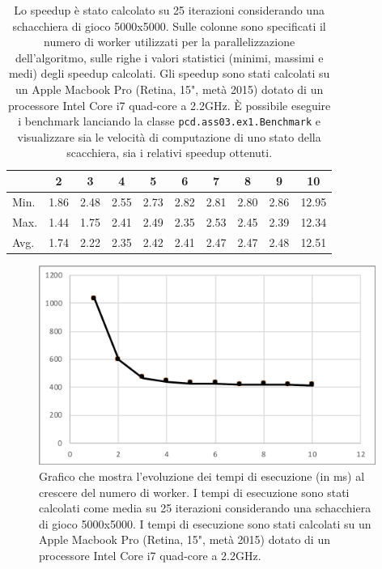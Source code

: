 \documentclass[a4paper]{article}
\begin{document}
\begin{table}[H]
\centering
\begin{tabular}{l|ccccccccc}
\hline
     & 2    & 3    & 4    & 5    & 6    & 7    & 8    & 9    & 10    \\ \hline
Min. & 1.86 & 2.48 & 2.55 & 2.73 & 2.82 & 2.81 & 2.80 & 2.86 & 12.95 \\
Max. & 1.44 & 1.75 & 2.41 & 2.49 & 2.35 & 2.53 & 2.45 & 2.39 & 12.34 \\
Avg. & 1.74 & 2.22 & 2.35 & 2.42 & 2.41 & 2.47 & 2.47 & 2.48 & 12.51 \\ \hline
\end{tabular}
\caption{Lo speedup è stato calcolato su 25 iterazioni considerando una schacchiera di gioco 5000x5000. Sulle colonne sono specificati il numero di worker utilizzati per la parallelizzazione dell'algoritmo, sulle righe i valori statistici (minimi, massimi e medi) degli speedup calcolati. Gli speedup sono stati calcolati su un Apple Macbook Pro (Retina, 15", metà 2015) dotato di un processore Intel Core i7 quad-core a 2.2GHz.
È possibile eseguire i benchmark lanciando la classe \texttt{pcd.ass03.ex1.Benchmark} e visualizzare sia le velocità di computazione di uno stato della scacchiera, sia i relativi speedup ottenuti.}
\label{speedup-table}
\end{table}

\begin{figure}[H]
    \centering
    \includegraphics[width=110mm]{res/execution_times.png}
    \caption{Grafico che mostra l'evoluzione dei tempi di esecuzione (in ms) al crescere del numero di worker. I tempi di esecuzione sono stati calcolati come media su 25 iterazioni considerando una schacchiera di gioco 5000x5000. I tempi di esecuzione sono stati calcolati su un Apple Macbook Pro (Retina, 15", metà 2015) dotato di un processore Intel Core i7 quad-core a 2.2GHz.}
    \label{fig:execution-times}
\end{figure}

\end{document}
